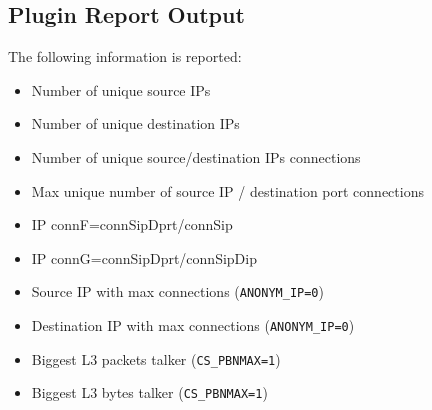 \documentclass[documentation]{subfiles}
\begin{document}
\subsection{Plugin Report Output}
The following information is reported:
\begin{itemize}
    \item Number of unique source IPs
    \item Number of unique destination IPs
    \item Number of unique source/destination IPs connections
    \item Max unique number of source IP / destination port connections
    \item IP connF=connSipDprt/connSip
    \item IP connG=connSipDprt/connSipDip
    \item Source IP with max connections ({\tt ANONYM\_IP=0})
    \item Destination IP with max connections ({\tt ANONYM\_IP=0})
    \item Biggest L3 packets talker ({\tt CS\_PBNMAX=1})
    \item Biggest L3 bytes talker ({\tt CS\_PBNMAX=1})
\end{itemize}
\end{document}
